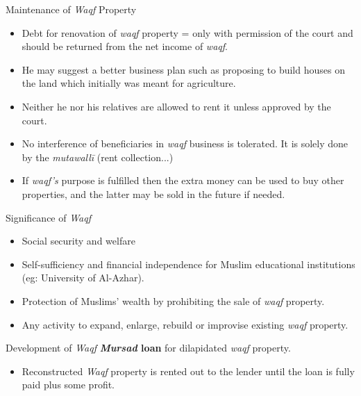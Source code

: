 \begin{frame}{Maintenance of \textit{Waqf} Property}
\begin{itemize}
\item Debt for renovation of \textit{waqf} property = only with permission of the court and should be returned from the net income of \textit{waqf}.
\item He may suggest a better business plan such as proposing to build houses on the land which initially was meant for agriculture.
\item Neither he nor his relatives are allowed to rent it unless approved by the court.
\item No interference of beneficiaries in \textit{waqf} business is tolerated. It is solely done by the \textit{mutawallī} (rent collection...)
\item If \textit{waqf's} purpose is fulfilled then the extra money can be used to buy other properties, and the latter may be sold in the future if needed.
\end{itemize}
\end{frame}

\begin{frame}{Significance of \textit{Waqf}}
\begin{itemize}
\item Social security and welfare
\item Self-sufficiency and financial independence for Muslim educational institutions (eg: University of Al-Azhar).
\item Protection of Muslims' wealth by prohibiting the sale of \textit{waqf} property.
\item Any activity to expand, enlarge, rebuild or improvise existing \textit{waqf} property.
\end{itemize}
\end{frame}

\begin{frame}{Development of \textit{Waqf}}
\textbf{\textit{Mursad} loan} for dilapidated \textit{waqf} property.
\begin{itemize}
\item Reconstructed \textit{Waqf} property is rented out to the lender until the loan is fully paid plus some profit.
\end{itemize}
\end{frame}

